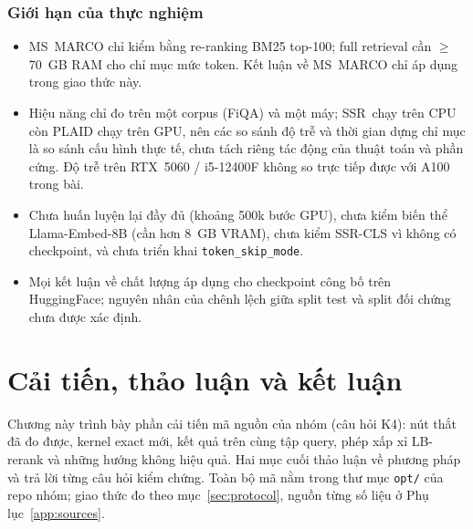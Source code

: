 \documentclass[a4paper,13pt]{extreport}
\theoremstyle{plain}
\newcommand{\ssr}{SSR}
\begin{document}
\subsection{Giới hạn của thực nghiệm}
\label{sec:limitations}
\begin{itemize}[leftmargin=1.5cm]
  \item MS~MARCO chỉ kiểm bằng re-ranking BM25 top-100; full retrieval cần $\ge$70~GB RAM cho chỉ mục mức token. Kết luận về MS~MARCO chỉ áp dụng trong giao thức này.
  \item Hiệu năng chỉ đo trên một corpus (FiQA) và một máy; \ssr\ chạy trên CPU còn PLAID chạy trên GPU, nên các so sánh độ trễ và thời gian dựng chỉ mục là so sánh cấu hình thực tế, chưa tách riêng tác động của thuật toán và phần cứng. Độ trễ trên RTX~5060 / i5-12400F không so trực tiếp được với A100 trong bài.
  \item Chưa huấn luyện lại đầy đủ (khoảng 500k bước GPU), chưa kiểm biến thể Llama-Embed-8B (cần hơn 8~GB VRAM), chưa kiểm \ssr-CLS vì không có checkpoint, và chưa triển khai \texttt{token\_skip\_mode}.
  \item Mọi kết luận về chất lượng áp dụng cho checkpoint công bố trên HuggingFace; nguyên nhân của chênh lệch giữa split test và split đối chứng chưa được xác định.
\end{itemize}
\chapter{Cải tiến, thảo luận và kết luận}
\label{ch:opt}

Chương này trình bày phần cải tiến mã nguồn của nhóm (câu hỏi K4): nút thắt đã đo được, kernel exact mới, kết quả trên cùng tập query, phép xấp xỉ LB-rerank và những hướng không hiệu quả. Hai mục cuối thảo luận về phương pháp và trả lời từng câu hỏi kiểm chứng. Toàn bộ mã nằm trong thư mục \texttt{opt/} của repo nhóm; giao thức đo theo mục~\ref{sec:protocol}, nguồn từng số liệu ở Phụ lục~\ref{app:sources}.
\end{document}
